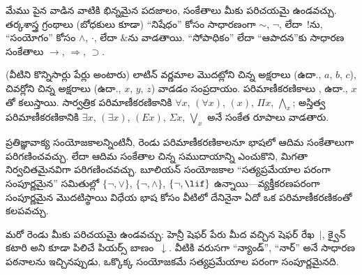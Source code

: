 \documentclass[../../../include/open-logic-section]{subfiles}
\begin{document}
\begin{intro}
మేము పైన వాడిన వాటికి భిన్నమైన పదజాలం, సంకేతాలు మీకు పరిచయమై
ఉండవచ్చు. తర్కశాస్త్ర గ్రంథాలు (బోధకులు కూడా) ``నిషేధం'' కోసం సాధారణంగా
$\sim$, $\neg$, లేదా~!ను, ``సంయోగం'' కోసం $\wedge$, $\cdot$, లేదా $\&$ను
వాడతాయి. ``సోపాధికం'' లేదా ``ఆపాదన''కు సాధారణ సంకేతాలు
$\rightarrow$, $\Rightarrow$, $\supset$.

 (వీటిని కొన్నిసార్లు పేర్లు అంటారు) లాటిన్ వర్ణమాల
మొదట్లోని చిన్న అక్షరాలు (ఉదా., $a$, $b$, $c$), 
చివర్లోని చిన్న అక్షరాలు (ఉదా., $x$, $y$, $z$) వాడడం సంప్రదాయం.
పరిమాణీకరణికాలు , ఉదా., $x$తో కలుస్తాయి. సార్వత్రిక
పరిమాణీకరణికానికి $\forall x$, $(\forall x)$, $(x)$, $\Pi x$,
$\bigwedge_x$; అస్తిత్వ పరిమాణీకరణికానికి $\exists x$, $(\exists
x)$, $(Ex)$, $\Sigma x$, $\bigvee_x$ అనే సంకేత రూపాలు వాడతారు.
\end{intro}

\begin{explain}
ప్రతిజ్ఞావాక్య సంయోజకాలన్నింటినీ, రెండు పరిమాణీకరణికాలనూ భాషలో
ఆదిమ సంకేతాలుగా పరిగణించవచ్చు. లేదా ఆదిమ సంకేతాల చిన్న
సముదాయాన్ని ఎంచుకొని, మిగతా  నిర్వచితమైనవిగా
పరిగణించవచ్చు. బూలియన్ సంయోజకాల ``సత్యప్రమేయాల పరంగా సంపూర్ణమైన''
సమితుల్లో $\{ \lnot, \lor \}$, $\{ \lnot, \land \}$, $\{ \lnot,
\lif\}$ ఉన్నాయి---వ్యక్తీకరణపరంగా సంపూర్ణమైన మొదటిస్థాయి విధేయ భాష
కోసం వీటిలో దేనినైనా ఏదో ఒక పరిమాణీకరణికంతో కలపవచ్చు.

మరో రెండు  మీకు పరిచయమై ఉండవచ్చు: హెన్రీ షెఫర్ పేరు
మీద వచ్చిన షెఫర్ రేఖ~$|$, క్వైన్ కటారి అని కూడా పిలిచే పియర్స్
బాణం~$\downarrow$. వీటికి వరుసగా ``న్యాండ్'', ``నార్'' అనే సాధారణ
పఠనాలను ఇచ్చినప్పుడు, ఒక్కొక్క సంయోజకమే సత్యప్రమేయాల పరంగా
సంపూర్ణమైనది.
\end{explain}
\end{document}
